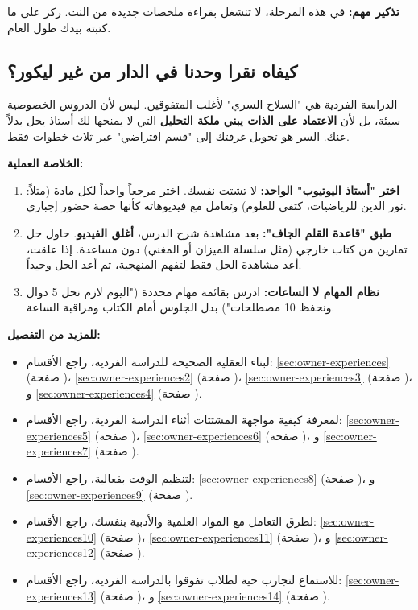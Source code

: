 \documentclass[12pt,a4paper]{book}
\newcommand{\importantAr}[1]{%
	\begin{important}
		\bfseries #1
	\end{important}
}
\begin{document}
	\textbf{تذكير مهم:} في هذه المرحلة، لا تنشغل بقراءة ملخصات جديدة من النت. ركز على ما كتبته بيدك طول العام.
	
	\subsection{كيفاه نقرا وحدنا في الدار من غير ليكور؟}
	
	الدراسة الفردية هي "السلاح السري" لأغلب المتفوقين. ليس لأن الدروس الخصوصية سيئة، بل لأن \textbf{الاعتماد على الذات يبني ملكة التحليل} التي لا يمنحها لك أستاذ يحل بدلاً عنك. السر هو تحويل غرفتك إلى "قسم افتراضي" عبر ثلاث خطوات فقط.
	
	\importantAr{الخلاصة العملية:}
	\begin{enumerate}
		\item \textbf{اختر "أستاذ اليوتيوب" الواحد:} لا تشتت نفسك. اختر مرجعاً واحداً لكل مادة (مثلاً: نور الدين للرياضيات، كتفي للعلوم) وتعامل مع فيديوهاته كأنها حصة حضور إجباري.
		\item \textbf{طبق "قاعدة القلم الجاف":} بعد مشاهدة شرح الدرس، \textbf{أغلق الفيديو}. حاول حل تمارين من كتاب خارجي (مثل سلسلة الميزان أو المغني) دون مساعدة. إذا علقت، أعد مشاهدة الحل فقط لتفهم المنهجية، ثم أعد الحل وحيداً.
		\item \textbf{نظام المهام لا الساعات:} ادرس بقائمة مهام محددة ("اليوم لازم نحل 5 دوال ونحفظ 10 مصطلحات") بدل الجلوس أمام الكتاب ومراقبة الساعة.
	\end{enumerate}
	
	\textbf{للمزيد من التفصيل:}
	\begin{itemize}
		\item لبناء العقلية الصحيحة للدراسة الفردية، راجع الأقسام: \ref{sec:owner-experiences} (صفحة \pageref{sec:owner-experiences})، \ref{sec:owner-experiences2} (صفحة \pageref{sec:owner-experiences2})، \ref{sec:owner-experiences3} (صفحة \pageref{sec:owner-experiences3})، و \ref{sec:owner-experiences4} (صفحة \pageref{sec:owner-experiences4}).
		\item لمعرفة كيفية مواجهة المشتتات أثناء الدراسة الفردية، راجع الأقسام: \ref{sec:owner-experiences5} (صفحة \pageref{sec:owner-experiences5})، \ref{sec:owner-experiences6} (صفحة \pageref{sec:owner-experiences6})، و \ref{sec:owner-experiences7} (صفحة \pageref{sec:owner-experiences7}).
		\item لتنظيم الوقت بفعالية، راجع الأقسام: \ref{sec:owner-experiences8} (صفحة \pageref{sec:owner-experiences8})، و \ref{sec:owner-experiences9} (صفحة \pageref{sec:owner-experiences9}).
		\item لطرق التعامل مع المواد العلمية والأدبية بنفسك، راجع الأقسام: \ref{sec:owner-experiences10} (صفحة \pageref{sec:owner-experiences10})، \ref{sec:owner-experiences11} (صفحة \pageref{sec:owner-experiences11})، و \ref{sec:owner-experiences12} (صفحة \pageref{sec:owner-experiences12}).
		\item للاستماع لتجارب حية لطلاب تفوقوا بالدراسة الفردية، راجع الأقسام: \ref{sec:owner-experiences13} (صفحة \pageref{sec:owner-experiences13})، و \ref{sec:owner-experiences14} (صفحة \pageref{sec:owner-experiences14}).
	\end{itemize}
	
\end{document}
